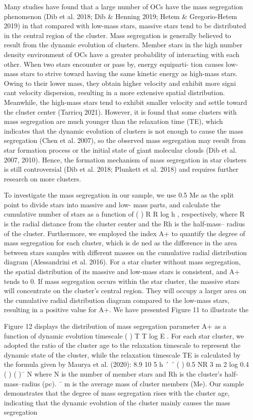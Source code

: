 \documentclass[../Main.tex]{subfiles}
\begin{document}
{Many studies have found that a large number of OCs have
the mass segregation phenomenon (Dib et al. 2018; Dib &
Henning 2019; Hetem & Gregorio-Hetem 2019) in that
compared with low-mass stars, massive stars tend to be
distributed in the central region of the cluster. Mass segregation
is generally believed to result from the dynamic evolution of
clusters. Member stars in the high number density environment
of OCs have a greater probability of interacting with each
other. When two stars encounter or pass by, energy equiparti-
tion causes low-mass stars to strive toward having the same
kinetic energy as high-mass stars. Owing to their lower mass,
they obtain higher velocity and exhibit more signi cant
velocity dispersion, resulting in a more extensive spatial
distribution. Meanwhile, the high-mass stars tend to exhibit
smaller velocity and settle toward the cluster center (Tarricq
2021). However, it is found that some clusters with mass
segregation are much younger than the relaxation time (TE),
which indicates that the dynamic evolution of clusters is not
enough to cause the mass segregation (Chen et al. 2007), so the
observed mass segregation may result from star formation
process or the initial state of giant molecular clouds (Dib et al.
2007, 2010). Hence, the formation mechanism of mass
segregation in star clusters is still controversial (Dib et al.
2018; Plunkett et al. 2018) and requires further research on
more clusters.

To investigate the mass segregation in our sample, we use
0.5 Me as the split point to divide stars into massive and low-
mass parts, and calculate the cumulative number of stars as a
function of ( ) R R
log h , respectively, where R is the radial
distance from the cluster center and the Rh is the half-mass–
radius of the cluster. Furthermore, we employed the index A+
to quantify the degree of mass segregation for each cluster,
which is de ned as the difference in the area between stars
samples with different masses on the cumulative radial
distribution diagram (Alessandrini et al. 2016). For a star
cluster without mass segregation, the spatial distribution of its
massive and low-mass stars is consistent, and A+ tends to 0. If
mass segregation occurs within the star cluster, the massive
stars will concentrate on the cluster’s central region. They will
occupy a larger area on the cumulative radial distribution
diagram compared to the low-mass stars, resulting in a positive
value for A+. We have presented Figure 11 to illustrate the

Figure 12 displays the distribution of mass segregation
parameter A+ as a function of dynamic evolution timescale
( ) T T
log E . For each star cluster, we adopted the ratio of the
cluster age to the relaxation timescale to represent the dynamic
state of the cluster, while the relaxation timescale TE is
calculated by the formula given by Maurya et al. (2020):
8.9 10
5
h
´ ´
( )
0.5
NR
3
m
2
log 0.4
( ) ( )¯
N
where N is the number of member stars and Rh is the cluster’s
half-mass–radius (pc).
¯
m is the average mass of cluster
members (Me). Our sample demonstrates that the degree of
mass segregation rises with the cluster age, indicating that the
dynamic evolution of the cluster mainly causes the mass
segregation

}
\end{document}
